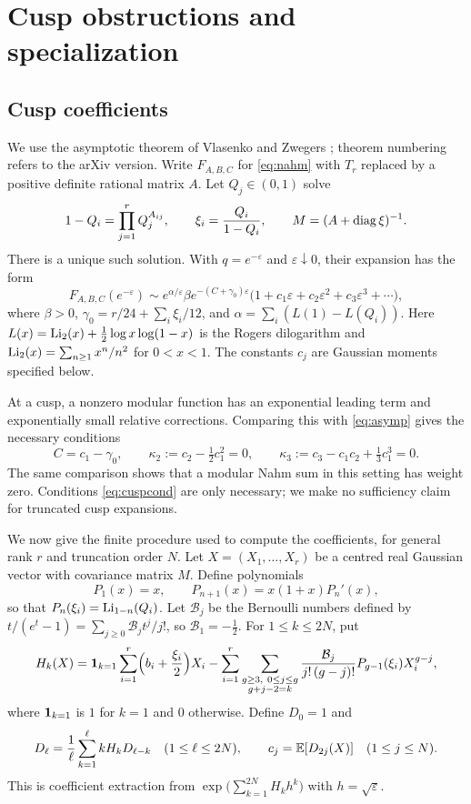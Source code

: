\section{Cusp obstructions and specialization}\label{sec:cusp}

\subsection{Cusp coefficients}
We use the asymptotic theorem of Vlasenko and Zwegers \cite[Theorem~2.3 and Corollary~3.2]{VZ11}; theorem numbering refers to the arXiv version. Write $F_{A,B,C}$ for \eqref{eq:nahm} with $T_r$ replaced by a positive definite rational matrix $A$. Let $Q_j\in(0,1)$ solve
\[
1-Q_i=\prod_{j=1}^rQ_j^{A_{ij}},\qquad \xi_i=\frac{Q_i}{1-Q_i},\qquad M=(A+\operatorname{diag}\xi)^{-1}.
\]
There is a unique such solution. With $q=e^{-\varepsilon}$ and $\varepsilon\downarrow0$, their expansion has the form
\begin{equation}\label{eq:asymp}
F_{A,B,C}(e^{-\varepsilon})\sim e^{\alpha/\varepsilon}\beta e^{-(C+\gamma_0)\varepsilon}\bigl(1+c_1\varepsilon+c_2\varepsilon^2+c_3\varepsilon^3+\cdots\bigr),
\end{equation}
where $\beta>0$, $\gamma_0=r/24+\sum_i\xi_i/12$, and $\alpha=\sum_i(L(1)-L(Q_i))$. Here $L(x)=\operatorname{Li}_2(x)+\frac12\log x\log(1-x)$ is the Rogers dilogarithm and $\operatorname{Li}_2(x)=\sum_{n\ge1}x^n/n^2$ for $0<x<1$. The constants $c_j$ are Gaussian moments specified below.

At a cusp, a nonzero modular function has an exponential leading term and exponentially small relative corrections. Comparing this with \eqref{eq:asymp} gives the necessary conditions
\begin{equation}\label{eq:cuspcond}
C=c_1-\gamma_0,\qquad \kappa_2:=c_2-\tfrac12c_1^2=0,\qquad \kappa_3:=c_3-c_1c_2+\tfrac13c_1^3=0.
\end{equation}
The same comparison shows that a modular Nahm sum in this setting has weight zero. Conditions \eqref{eq:cuspcond} are only necessary; we make no sufficiency claim for truncated cusp expansions.

We now give the finite procedure used to compute the coefficients, for general rank $r$ and truncation order $N$. Let $X=(X_1,\dots,X_r)$ be a centred real Gaussian vector with covariance matrix $M$. Define polynomials
\[
P_1(x)=x,\qquad P_{n+1}(x)=x(1+x)P_n'(x),
\]
so that $P_n(\xi_i)=\operatorname{Li}_{1-n}(Q_i)$. Let $\mathcal B_j$ be the Bernoulli numbers defined by $t/(e^t-1)=\sum_{j\ge0}\mathcal B_jt^j/j!$, so $\mathcal B_1=-\frac12$. For $1\le k\le 2N$, put
\[
H_k(X)=\one_{k=1}\sum_{i=1}^r\Bigl(b_i+\frac{\xi_i}2\Bigr)X_i-\sum_{i=1}^r\sum_{\substack{g\ge3,\ 0\le j\le g\\ g+j-2=k}}\frac{\mathcal B_j}{j!\,(g-j)!}P_{g-1}(\xi_i)X_i^{g-j},
\]
where $\mathbf{1}_{k=1}$ is $1$ for $k=1$ and $0$ otherwise. Define $D_0=1$ and
\[
D_\ell=\frac1\ell\sum_{k=1}^\ell kH_kD_{\ell-k}\quad(1\le \ell\le2N),\qquad c_j=\mathbb{E}[D_{2j}(X)]\quad(1\le j\le N).
\]
This is coefficient extraction from $\exp\bigl(\sum_{k=1}^{2N}H_kh^k\bigr)$ with $h=\sqrt\varepsilon$.

